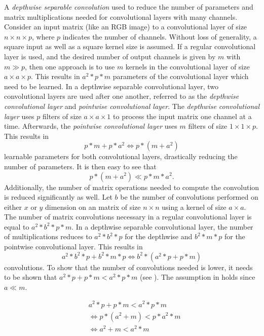 A \textit{depthwise separable convolution} \cite{sifre_rigid-motion_2014} \cite{chollet_xception:_2017} used to reduce the number of parameters and matrix multiplications needed for convolutional layers with many channels.
Consider an input matrix (like an RGB image) to a convolutional layer of size $n \times n \times p$, where $p$ indicates the number of channels.
Without loss of generality, a square input as well as a square kernel size is assumed.
If a regular convolutional layer is used, and the desired number of output channels is given by $m$ with $m \gg p$, then one approach is to use $m$ kernels in the convolutional layer of size $a \times a \times p$.
This results in $a^2 * p * m$ parameters of the convolutional layer which need to be learned.
In a depthwise separable convolutional layer, two convolutional layers are used after one another, referred to as the \textit{depthwise convolutional layer} and \textit{pointwise convolutional layer}.
The \textit{depthwise convolutional layer} uses $p$ filters of size $a \times a \times 1$ to process the input matrix one channel at a time.
Afterwards, the \textit{pointwise convolutional layer} uses $m$ filters of size $1 \times 1 \times p$.
This results in $$p * m + p * a^2 \Leftrightarrow p * (m + a^2)$$ learnable parameters for both convolutional layers, drastically reducing the number of parameters.
It is then easy to see that $$p * (m + a^2) \ll p * m * a^2.$$
Additionally, the number of matrix operations needed to compute the convolution is reduced significantly as well.
Let $b$ be the number of convolutions performed on either $x$ or $y$ dimension on an matrix of size $n \times n$ using a kernel of size $a \times a$.
The number of matrix convolutions necessary in a regular convolutional layer is equal to $a^2 * b^2 * p * m$.
In a depthwise separable convolutional layer, the number of multiplications reduces to $a^2 * b^2 * p $ for the depthwise and $b^2 * m * p$ for the pointwise convolutional layer.
This results in $$a^2 * b^2 * p + b^2 * m * p \Leftrightarrow b^2 * (a^2 * p + p * m) $$ convolutions.
To show that the number of convolutions needed is lower, it needs to be shown that $a^2 * p + p * m < a^2 * p * m$ (see ).
The assumption in holds since $a \ll m$.

\begin{equation}
    \label{eq:convolution_proof}
    \begin{split}
        &a^2 * p + p * m < a^2 * p * m \\
        &\Leftrightarrow p * (a^2 + m) < p * a^2 * m \\
        &\Leftrightarrow a^2 + m < a^2 * m  
    \end{split}
\end{equation}

